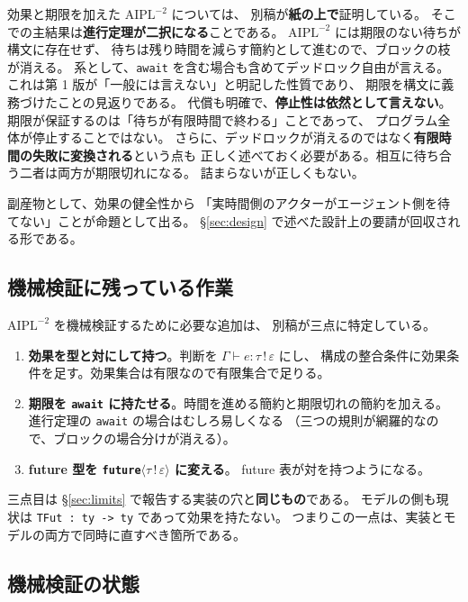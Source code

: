 \documentclass[11pt,a4paper]{ltjsarticle}
\theoremstyle{definition}
\theoremstyle{remark}
\begin{document}
効果と期限を加えた $\mathrm{AIPL}^{-2}$ については、
別稿\cite{selfsound2}が\textbf{紙の上で}証明している。
そこでの主結果は\textbf{進行定理が二択になる}ことである。
$\mathrm{AIPL}^{-2}$ には期限のない待ちが構文に存在せず、
待ちは残り時間を減らす簡約として進むので、ブロックの枝が消える。
系として、\texttt{await} を含む場合も含めてデッドロック自由が言える。
これは第 1 版\cite{selfsound1}が「一般には言えない」と明記した性質であり、
期限を構文に義務づけたことの見返りである。
代償も明確で、\textbf{停止性は依然として言えない}。
期限が保証するのは「待ちが有限時間で終わる」ことであって、
プログラム全体が停止することではない。
さらに、デッドロックが消えるのではなく\textbf{有限時間の失敗に変換される}という点も
正しく述べておく必要がある。相互に待ち合う二者は両方が期限切れになる。
詰まらないが正しくもない。

副産物として、効果の健全性から
「実時間側のアクターがエージェント側を待てない」ことが命題として出る。
\S\ref{sec:design} で述べた設計上の要請が回収される形である。

\subsection{機械検証に残っている作業}
\label{sec:tobeproved}

$\mathrm{AIPL}^{-2}$ を機械検証するために必要な追加は、
別稿\cite{selfsound2}が三点に特定している。

\begin{enumerate}
\item \textbf{効果を型と対にして持つ}。判断を $\Gamma \vdash e : \tau\,!\,\varepsilon$ にし、
      構成の整合条件に効果条件を足す。効果集合は有限なので有限集合で足りる。
\item \textbf{期限を \texttt{await} に持たせる}。時間を進める簡約と期限切れの簡約を加える。
      進行定理の \texttt{await} の場合はむしろ易しくなる
      （三つの規則が網羅的なので、ブロックの場合分けが消える）。
\item \textbf{future 型を \texttt{future}$\langle\tau\,!\,\varepsilon\rangle$ に変える}。
      future 表が対を持つようになる。
\end{enumerate}

三点目は \S\ref{sec:limits} で報告する実装の穴と\textbf{同じもの}である。
モデルの側も現状は \texttt{TFut : ty -> ty} であって効果を持たない。
つまりこの一点は、実装とモデルの両方で同時に直すべき箇所である。

\subsection{機械検証の状態}
\end{document}

